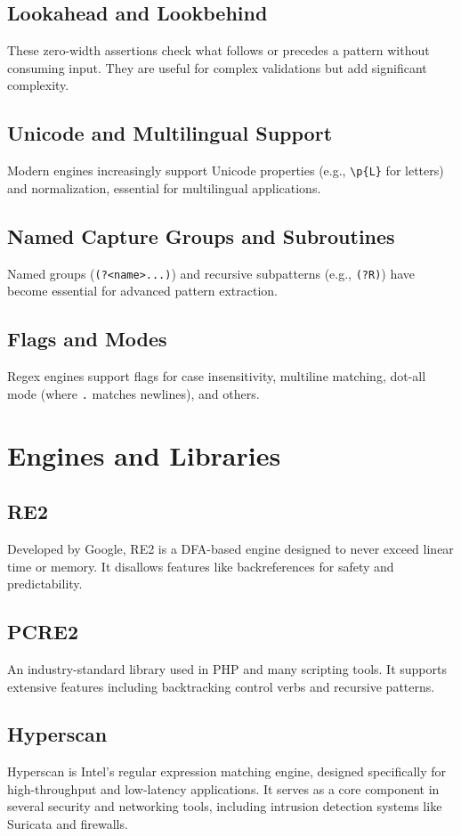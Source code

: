 \subsection{Lookahead and Lookbehind}
These zero-width assertions check what follows or precedes a pattern without consuming input. They are useful for complex validations but add significant complexity.

\subsection{Unicode and Multilingual Support}
Modern engines increasingly support Unicode properties (e.g., \verb|\p{L}| for letters) and normalization, essential for multilingual applications.

\subsection{Named Capture Groups and Subroutines}
Named groups (\verb|(?<name>...)|) and recursive subpatterns (e.g., \verb|(?R)|) have become essential for advanced pattern extraction.

\subsection{Flags and Modes}
Regex engines support flags for case insensitivity, multiline matching, dot-all mode (where \verb|.| matches newlines), and others.

\section{Engines and Libraries}
\subsection{RE2}
Developed by Google, RE2 is a DFA-based engine designed to never exceed linear time or memory. It disallows features like backreferences for safety and predictability. 

\subsection{PCRE2}
An industry-standard library used in PHP and many scripting tools. It supports extensive features including backtracking control verbs and recursive patterns. %

\subsection{Hyperscan}
Hyperscan is Intel’s regular expression matching engine, designed specifically for high-throughput and low-latency applications. It serves as a core component in several security and networking tools, including intrusion detection systems like Suricata and firewalls.

